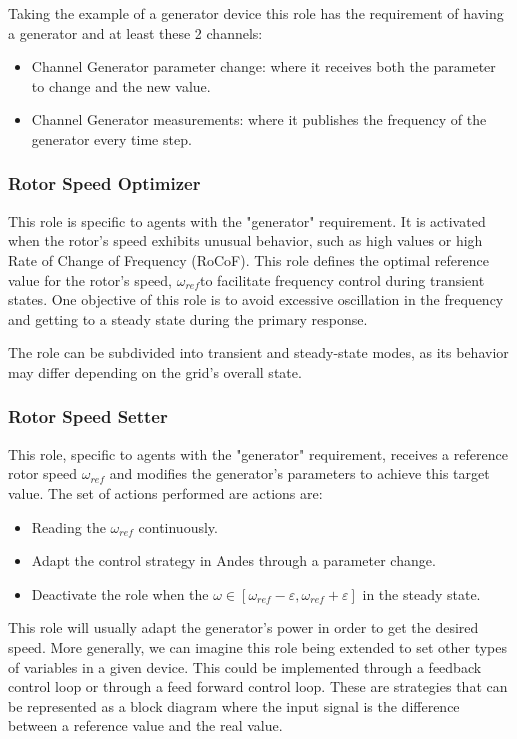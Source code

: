 \documentclass{article}
\begin{document}
Taking the example of a generator device this role has the requirement of having a generator and at least these 2 channels:

\begin{itemize}
    \item Channel Generator parameter change: where it receives both the parameter to change and the new value.
    \item Channel Generator measurements: where it publishes the frequency of the generator every time step.
\end{itemize}

\subsubsection*{Rotor Speed Optimizer}

This role is specific to agents with the "generator" requirement. It is activated when the rotor's speed exhibits unusual behavior, such as high values or high Rate of Change of Frequency (RoCoF). This role defines the optimal reference value for the rotor's speed, $\omega_{ref}$to facilitate frequency control during transient states. One objective of this role is to avoid excessive oscillation in the frequency and getting to a steady state during the primary response.

The role can be subdivided into transient and steady-state modes, as its behavior may differ depending on the grid's overall state.  

\subsubsection*{Rotor Speed Setter}

This role, specific to agents with the "generator" requirement, receives a reference rotor speed $\omega_{ref}$ and modifies the generator's parameters to achieve this target value. The set of actions performed are actions are:

\begin{itemize}
    \item Reading the $\omega_{ref}$ continuously.
    \item Adapt the control strategy in Andes through a parameter change.
    \item Deactivate the role when the $\omega \in [\omega_{ref} - \varepsilon, \omega_{ref} + \varepsilon]$ in the steady state.
\end{itemize}

This role will usually adapt the generator's power in order to get the desired speed. More generally, we can imagine this role being extended to set other types of variables in a given device. This could be implemented through a feedback control loop or through a feed forward control loop. These are strategies that can be represented as a block diagram where the input signal is the difference between a reference value and the real value. 
\end{document}
